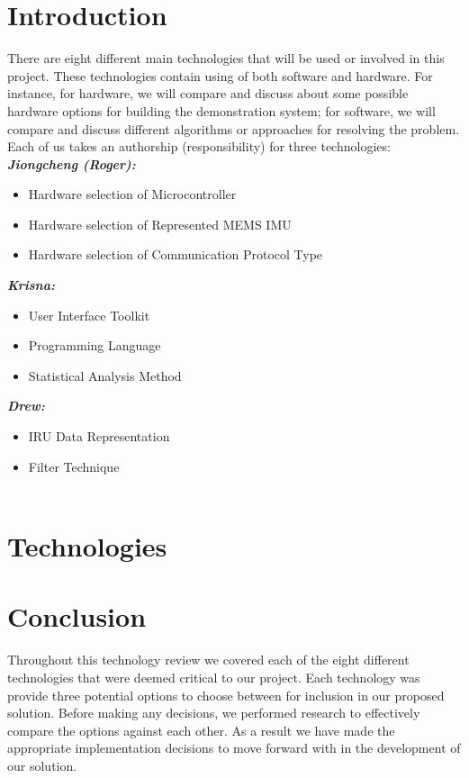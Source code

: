 \documentclass[letterpaper,10pt,onecolumn]{IEEEtran}
\begin{document}
\newpage
\section{Introduction}
There are eight different main technologies that will be used or involved in this project.
These technologies contain using of both software and hardware.
For instance, for hardware, we will compare and discuss about some possible hardware options for building the demonstration system; for software, we will compare and discuss different algorithms or approaches for resolving the problem.
Each of us takes an authorship (responsibility) for three technologies:\\

\textit{\textbf{Jiongcheng (Roger):}}
\begin{itemize}
	\item Hardware selection of Microcontroller
	\item Hardware selection of Represented MEMS IMU
	\item Hardware selection of Communication Protocol Type
\end{itemize}

\textit{\textbf{Krisna:}}
\begin{itemize}
	\item User Interface Toolkit
	\item Programming Language
	\item Statistical Analysis Method
\end{itemize}

\textit{\textbf{Drew:}}
\begin{itemize}
	\item IRU Data Representation
	\item Filter Technique\\\\
\end{itemize}



\section{Technologies}
	
	
	

\section{Conclusion}
Throughout this technology review we covered each of the eight different technologies that were deemed critical to our project.
Each technology was provide three potential options to choose between for inclusion in our proposed solution.
Before making any decisions, we performed research to effectively compare the options against each other.
As a result we have made the appropriate implementation decisions to move forward with in the development of our solution.


\newpage
\nocite{*}


\end{document}
